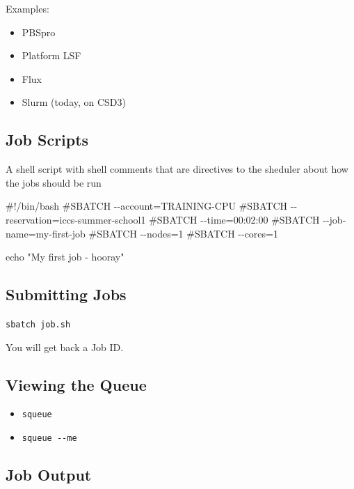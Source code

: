\documentclass[
  letterpaper,
  DIV=11,
  numbers=noendperiod]{scrartcl}
\newenvironment{Shaded}{\begin{snugshade}}{\end{snugshade}}
\newcommand{\BuiltInTok}[1]{\textcolor[rgb]{0.00,0.23,0.31}{#1}}
\newcommand{\CommentTok}[1]{\textcolor[rgb]{0.37,0.37,0.37}{#1}}
\newcommand{\StringTok}[1]{\textcolor[rgb]{0.13,0.47,0.30}{#1}}
\providecommand{\tightlist}{%
  \setlength{\itemsep}{0pt}\setlength{\parskip}{0pt}}
\begin{document}
Examples:

\begin{itemize}
\tightlist
\item
  PBSpro
\item
  Platform LSF
\item
  Flux
\item
  Slurm (today, on CSD3)
\end{itemize}

\subsection{Job Scripts}\label{job-scripts}

A shell script with shell comments that are directives to the sheduler
about how the jobs should be run

\begin{Shaded}
\begin{Highlighting}[]
\CommentTok{\#!/bin/bash}
\CommentTok{\#SBATCH {-}{-}account=TRAINING{-}CPU }
\CommentTok{\#SBATCH {-}{-}reservation=iccs{-}summer{-}school1}
\CommentTok{\#SBATCH {-}{-}time=00:02:00}
\CommentTok{\#SBATCH {-}{-}job{-}name=my{-}first{-}job}
\CommentTok{\#SBATCH {-}{-}nodes=1}
\CommentTok{\#SBATCH {-}{-}cores=1}

\BuiltInTok{echo} \StringTok{"My first job {-} hooray"}
\end{Highlighting}
\end{Shaded}

\subsection{Submitting Jobs}\label{submitting-jobs}

\texttt{sbatch\ job.sh}

You will get back a Job ID.

\subsection{Viewing the Queue}\label{viewing-the-queue}

\begin{itemize}
\tightlist
\item
  \texttt{squeue}
\item
  \texttt{squeue\ -\/-me}
\end{itemize}

\subsection{Job Output}\label{job-output}
\end{document}
